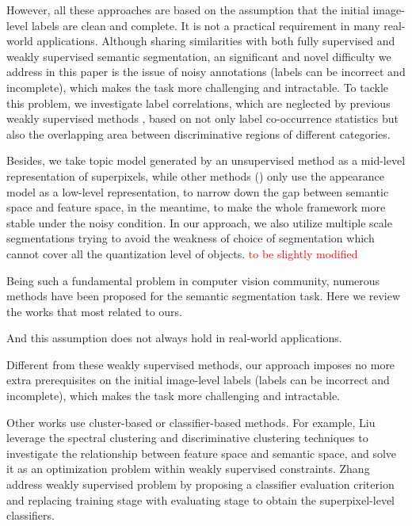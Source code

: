 However, all these approaches are based on the assumption that the initial image-level labels are clean and complete. It is not a practical requirement in many real-world applications. Although sharing similarities with both fully supervised and weakly supervised semantic segmentation, an significant and novel difficulty we address in this paper is the issue of noisy annotations (\eg labels can be incorrect and incomplete), which makes the task more challenging and intractable. To tackle this problem, we investigate label correlations, which are neglected by previous weakly supervised methods \cite{verbeek2007region,vezhnevets2010towards,vezhnevets2011weakly,vezhnevets2012weakly,xu2014tell}, based on not only label co-occurrence statistics but also the overlapping area between discriminative regions of different categories.

Besides, we take topic model generated by an unsupervised method as a mid-level representation of superpixels, while other methods (\eg \cite{vezhnevets2011weakly,xu2014tell}) only use the appearance model as a low-level representation, to narrow down the gap between semantic space and feature space, in the meantime, to make the whole framework more stable under the noisy condition. In our approach, we also utilize multiple scale segmentations trying to avoid the weakness of choice of segmentation which cannot cover all the quantization level of objects. {\textcolor{red}{to be slightly modified}}

\if
Being such a fundamental problem in computer vision community, numerous methods have been proposed for the semantic segmentation task. Here we review the works that most related to ours.

And this assumption does not always hold in real-world applications.

Different from these weakly supervised methods, our approach imposes no more extra prerequisites on the initial image-level labels (\eg labels can be incorrect and incomplete), which makes the task more challenging and intractable.

Other works use cluster-based or classifier-based methods. For example, Liu \etal \cite{liu2013weakly} leverage the spectral clustering and discriminative clustering techniques to investigate the relationship between feature space and semantic space, and solve it as an optimization problem within weakly supervised constraints. Zhang \etal \cite{zhang2013sparse} address weakly supervised problem by proposing a classifier evaluation criterion and replacing training stage with evaluating stage to obtain the superpixel-level classifiers.
\fi
